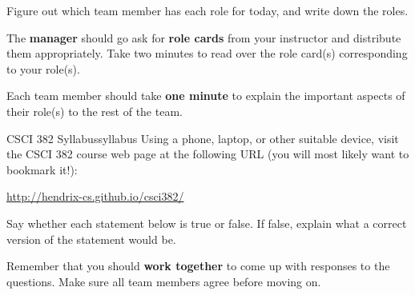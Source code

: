 \documentclass{tufte-handout}
\begin{document}
\begin{questions}
\item Figure out which team member has each role for today, and write
  down the roles.
\item The \textbf{manager} should go ask for \textbf{role cards}
  from your instructor and distribute them appropriately.  Take two
  minutes to read over the role card(s) corresponding to your role(s).
\item Each team member should take \textbf{one minute} to explain the
  important aspects of their role(s) to the rest of the team.
\end{questions}

\newpage
\begin{model*}{CSCI 382 Syllabus}{syllabus}
  Using a phone, laptop, or other suitable device, visit the CSCI 382
  course web page at the following URL (you will most likely want to
  bookmark it!): \bigskip

  \url{http://hendrix-cs.github.io/csci382/}
\end{model*}

Say whether each statement below is true or false.  If false, explain
what a correct version of the statement would be.

Remember that you should \textbf{work together} to come up with
responses to the questions.  Make sure all team members agree before
moving on.
\end{document}
